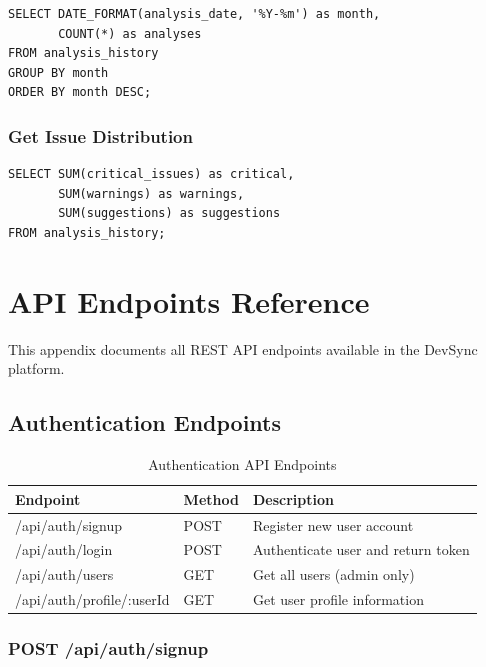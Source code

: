\documentclass[12pt,a4paper]{article}
\begin{document}
    \begin{verbatim}
SELECT DATE_FORMAT(analysis_date, '%Y-%m') as month,
       COUNT(*) as analyses
FROM analysis_history
GROUP BY month
ORDER BY month DESC;
    \end{verbatim}

    \subsubsection{Get Issue Distribution}

    \begin{verbatim}
SELECT SUM(critical_issues) as critical,
       SUM(warnings) as warnings,
       SUM(suggestions) as suggestions
FROM analysis_history;
    \end{verbatim}



    \section{API Endpoints Reference}

    This appendix documents all REST API endpoints available in the DevSync platform.

    \subsection{Authentication Endpoints}

    \begin{table}[H]
        \caption{Authentication API Endpoints}
        \begin{tabular}{|l|l|p{6cm}|}
            \hline
            \textbf{Endpoint} & \textbf{Method} & \textbf{Description} \\
            \hline
            /api/auth/signup & POST & Register new user account \\
            \hline
            /api/auth/login & POST & Authenticate user and return token \\
            \hline
            /api/auth/users & GET & Get all users (admin only) \\
            \hline
            /api/auth/profile/:userId & GET & Get user profile information \\
            \hline
        \end{tabular}
    \end{table}

    \subsubsection{POST /api/auth/signup}
\end{document}
